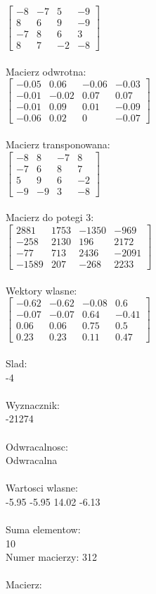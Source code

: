 \documentclass[a4paper,12pt]{article}
\begin{document}
$\begin{bmatrix} -8&-7&5&-9\\8&6&9&-9\\-7&8&6&3\\8&7&-2&-8 \end{bmatrix}$
\\
\\
Macierz odwrotna:\\

$\begin{bmatrix} -0.05&0.06&-0.06&-0.03\\-0.01&-0.02&0.07&0.07\\-0.01&0.09&0.01&-0.09\\-0.06&0.02&0&-0.07 \end{bmatrix}$
\\
\\
Macierz transponowana:\\

$\begin{bmatrix} -8&8&-7&8\\-7&6&8&7\\5&9&6&-2\\-9&-9&3&-8 \end{bmatrix}$
\\
\\
Macierz do potegi 3:\\

$\begin{bmatrix} 2881&1753&-1350&-969\\-258&2130&196&2172\\-77&713&2436&-2091\\-1589&207&-268&2233 \end{bmatrix}$
\\
\\
Wektory wlasne:\\

$\begin{bmatrix} -0.62&-0.62&-0.08&0.6\\-0.07&-0.07&0.64&-0.41\\0.06&0.06&0.75&0.5\\0.23&0.23&0.11&0.47 \end{bmatrix}$
\\
\\
Slad:\\
-4
\\
\\
Wyznacznik:\\
-21274
\\
\\
Odwracalnosc:\\
Odwracalna
\\
\\
Wartosci wlasne:\\
-5.95 -5.95 14.02 -6.13
\\
\\
Suma elementow:\\
10
\\
\newpage
Numer macierzy:
312
\\
\\
Macierz:\\
\end{document}
